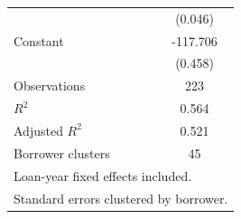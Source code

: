 {\begin{tabular}{l*{1}{c}}
                    &     (0.046)   \\
Constant            &    -117.706   \\
                    &     (0.458)   \\
\hline
Observations        &         223   \\
\(R^{2}\)           &       0.564   \\
Adjusted \(R^{2}\)  &       0.521   \\
Borrower clusters   &          45   \\
\hline\hline
\multicolumn{2}{l}{\footnotesize Loan-year fixed effects included.}\\
\multicolumn{2}{l}{\footnotesize Standard errors clustered by borrower.}\\
\end{tabular}
}
